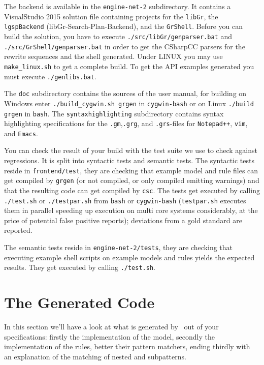 The backend is available in the \texttt{engine-net-2} subdirectory. 
It contains a VisualStudio 2015 solution file containing projects for the \texttt{libGr}, the \texttt{lgspBackend} (libGr-Search-Plan-Backend), and the \texttt{GrShell}.
Before you can build the solution, you have to execute \texttt{./src/libGr/genparser.bat} and \texttt{./src/Gr\-Shell/genparser.bat} in order 
to get the CSharpCC parsers for the rewrite sequences and the shell generated.
Under LINUX you may use \texttt{make\_linux.sh} to get a complete build.
To get the API examples generated you must execute \texttt{./genlibs.bat}.

The \texttt{doc} subdirectory contains the sources of the user manual, for building on Windows enter \texttt{./build\_cygwin.sh grgen} in \texttt{cygwin-bash} or on Linux \texttt{./build grgen} in \texttt{bash}.
The \texttt{syntaxhighlighting} subdirectory contains syntax highlighting specifications for the \texttt{.gm},\texttt{.grg}, and \texttt{.grs}-files for \texttt{Notepad++}, \texttt{vim}, and \texttt{Emacs}.

You can check the result of your build with the test suite we use to check against regressions.
It is split into syntactic tests and semantic tests. 
The syntactic tests reside in \texttt{frontend/test}, they are checking that example model and rule files can get compiled by \texttt{grgen} (or not compiled, or only compiled emitting warnings) and that the resulting code can get compiled by \texttt{csc}.
The tests get executed by calling \texttt{./test.sh} or \texttt{./testpar.sh} from \texttt{bash} or \texttt{cygwin-bash} (\texttt{testpar.sh} executes them in parallel speeding up execution on multi core systems considerably, at the price of potential false positive reports); deviations from a gold standard are reported.

The semantic tests reside in \texttt{engine-net-2/tests}, they are checking that executing example shell scripts on example models and rules yields the expected results. 
They get executed by calling \texttt{./test.sh}.


\section{The Generated Code}\label{sec:generatedcode}
In this section we'll have a look at what is generated by \GrG~out of your specifications: firstly the implementation of the model, secondly the implementation of the rules, better their pattern matchers, ending thirdly with an explanation of the matching of nested and subpatterns.

